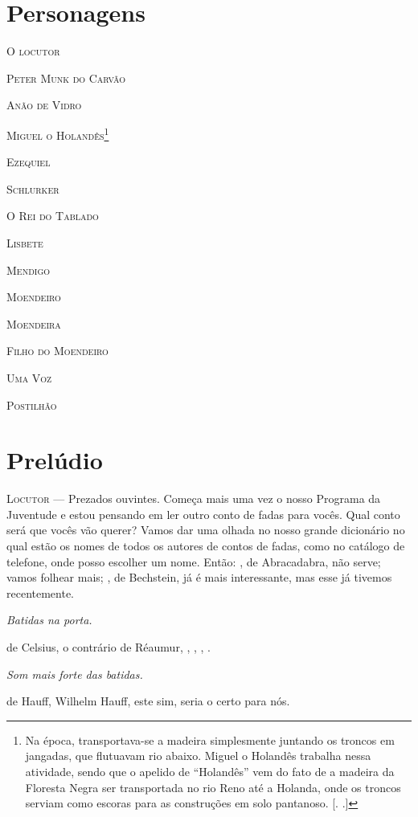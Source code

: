 \section{Personagens}

\textsc{O locutor}

\textsc{Peter Munk do Carvão}

\textsc{Anão de Vidro}

\textsc{Miguel o Holandês}\footnote{Na época, transportava-se a madeira
  simplesmente juntando os troncos em jangadas, que flutuavam rio
  abaixo. Miguel o Holandês trabalha nessa atividade, sendo que o
  apelido de ``Holandês'' vem do fato de a madeira da Floresta Negra ser
  transportada no rio Reno até a Holanda, onde os troncos serviam como
  escoras para as construções em solo pantanoso. [. .]}

\textsc{Ezequiel}

\textsc{Schlurker}

\textsc{O Rei do Tablado}

\textsc{Lisbete}

\textsc{Mendigo}

\textsc{Moendeiro}

\textsc{Moendeira}

\textsc{Filho do Moendeiro}

\textsc{Uma Voz}

\textsc{Postilhão}

\section{Prelúdio}

\textsc{Locutor} --- Prezados ouvintes. Começa mais uma vez o nosso Programa da
Juventude e estou pensando em ler outro conto de fadas para vocês. Qual
conto será que vocês vão querer? Vamos dar uma olhada no nosso grande
dicionário no qual estão os nomes de todos os autores de contos de
fadas, como no catálogo de telefone, onde posso escolher um nome. Então:
, de Abracadabra, não serve; vamos folhear mais; , de Bechstein, já é
mais interessante, mas esse já tivemos recentemente.

\emph{Batidas na porta.}

 de Celsius, o contrário de Réaumur, , , , .

\emph{Som mais forte das batidas.}

 de Hauff, Wilhelm Hauff, este sim, seria o certo para nós.

